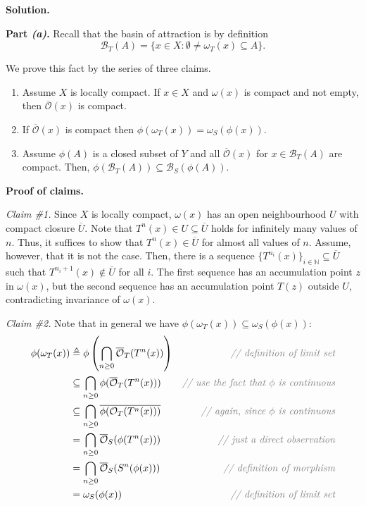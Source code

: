 \documentclass{template}
\begin{document}
\textbf{Solution.}

\textcolor{blue!70!black}{\textbf{Part \textit{(a)}.}} Recall that the basin of
attraction is by definition 
\begin{equation*}
    \mathcal{B}_T(A) = \{x \in X: \emptyset \neq \omega_T(x) \subseteq A\}.  
\end{equation*}

We prove this fact by the series of three claims.
\begin{enumerate}[label=\textbf{Claim \#\arabic*}, align=left]
    \item Assume $X$ is locally compact. If $x \in X$ and $\omega(x)$ is compact and not empty, then $\overline{\mathcal{O}}(x)$ is compact.
    \item If $\overline{\mathcal{O}}(x)$ is compact then $\phi(\omega_T(x)) = \omega_S(\phi(x))$.
    \item Assume $\phi(A)$ is a closed subset of $Y$ and all
    $\overline{\mathcal{O}}(x)$ for $x \in \mathcal{B}_T(A)$ are compact. Then, $\phi(\mathcal{B}_T(A)) \subseteq \mathcal{B}_S(\phi(A))$.
\end{enumerate}

\textbf{Proof of claims.}

\textit{Claim \#1.} Since $X$ is locally compact, $\omega(x)$ has an open
neighbourhood $U$ with compact closure $\overline{U}$. Note that $T^n(x) \in U
\subseteq \overline{U}$ holds for infinitely many values of $n$. Thus, it
suffices to show that $T^n(x) \in \overline{U}$ for almost all values of $n$.
Assume, however, that it is not the case. Then, there is a sequence
$\{T^{n_i}(x)\}_{i \in \mathbb{N}} \subseteq \overline{U}$ such that
$T^{n_i+1}(x) \not\in \overline{U}$ for all $i$. The first sequence has an
accumulation point $z$ in $\omega(x)$, but the second sequence has an
accumulation point $T(z)$ outside $U$, contradicting invariance of $\omega(x)$.

\textit{Claim \#2.} Note that in general we have $\phi(\omega_T(x)) \subseteq \omega_S(\phi(x))$:
\begin{align*}
    \phi(\omega_T(x)) &\triangleq \phi\left(\bigcap_{n \geq 0}\overline{\mathcal{O}}_T(T^n(x))\right) & \textcolor{gray}{\textit{// definition of limit set}} \\
    & \subseteq \bigcap_{n \geq 0}\phi(\overline{\mathcal{O}}_T(T^n(x))) & \textcolor{gray}{\textit{// use the fact that $\phi$ is continuous}} \\
    & \subseteq \bigcap_{n \geq 0}\overline{\phi(\mathcal{O}_T(T^n(x)))} & \textcolor{gray}{\textit{// again, since $\phi$ is continuous}} \\
    & = \bigcap_{n \geq 0}\overline{\mathcal{O}}_S(\phi(T^n(x))) & \textcolor{gray}{\textit{// just a direct observation}} \\
    & = \bigcap_{n \geq 0}\overline{\mathcal{O}}_S(S^n(\phi(x))) & \textcolor{gray}{\textit{// definition of morphism}} \\
    & = \omega_S(\phi(x)) & \textcolor{gray}{\textit{// definition of limit set}} \\
\end{align*}
\end{document}
